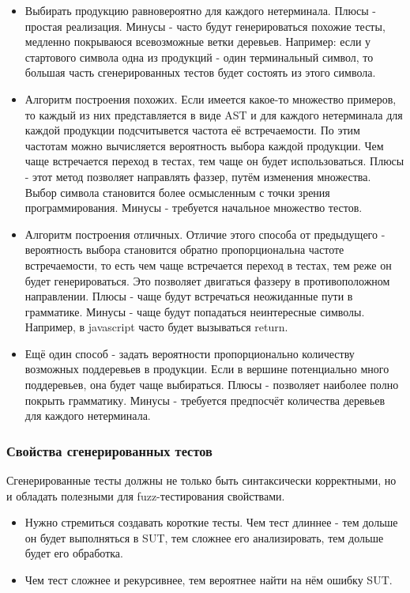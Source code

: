 \documentclass[a4paper]{article}
\begin{document}
\begin{itemize}
\item Выбирать продукцию равновероятно для каждого нетерминала. Плюсы - простая реализация. Минусы - часто будут генерироваться похожие тесты, медленно покрываюся всевозможные ветки деревьев. Например: если у стартового символа одна из продукций - один терминальный символ, то большая часть сгенерированных тестов будет состоять из этого символа.
\item Алгоритм построения похожих\cite{litlink1}. Если имеется какое-то множество примеров, то каждый из них представляется в виде AST и для каждого нетерминала для каждой продукции подсчитывется частота её встречаемости. По этим частотам можно вычисляется вероятность выбора каждой продукции. Чем чаще встречается переход в тестах, тем чаще он будет использоваться. Плюсы - этот метод позволяет направлять фаззер, путём изменения множества. Выбор символа становится более осмысленным с точки зрения программирования. Минусы - требуется начальное множество тестов.
\item Алгоритм построения отличных\cite{litlink1}. Отличие этого способа от предыдущего - вероятность выбора становится обратно пропорциональна частоте встречаемости, то есть чем чаще встречается переход в тестах, тем реже он будет генерироваться. Это позволяет двигаться фаззеру в противоположном направлении. Плюсы - чаще будут встречаться неожиданные пути в грамматике. Минусы - чаще будут попадаться неинтересные символы. Например, в javascript часто будет вызываться return. 
\item Ещё один способ - задать вероятности пропорционально количеству возможных поддеревьев в продукции. Если в вершине потенциально много поддеревьев, она будет чаще выбираться.
Плюсы - позволяет наиболее полно покрыть грамматику. 
Минусы - требуется предпосчёт количества деревьев для каждого нетерминала.
\end{itemize}

\subsubsection{Свойства сгенерированных тестов}
\indent

Сгенерированные тесты должны не только быть синтаксически корректными, но и обладать полезными для fuzz-тестирования свойствами.

\begin{itemize}
\item Нужно стремиться создавать короткие тесты. Чем тест длиннее - тем дольше он будет выполняться в SUT, тем сложнее его анализировать, тем дольше будет его обработка. 
\item Чем тест сложнее и рекурсивнее, тем вероятнее найти на нём ошибку SUT. 
\end{itemize}
\end{document}
